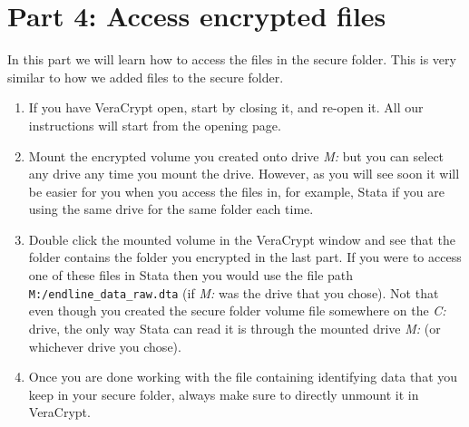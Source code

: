 \documentclass{tufte-handout}
\begin{document}
\section{Part 4: Access encrypted files}

In this part we will learn how to access the files in the secure folder. This is very similar to how we added files to the secure folder.

\begin{enumerate}
	\item If you have VeraCrypt open, start by closing it, and re-open it. All our instructions will start from the opening page.
	\item Mount the encrypted volume you created onto drive \textit{M:} but you can select any drive any time you mount the drive. However, as you will see soon it will be easier for you when you access the files in, for example, Stata if you are using the same drive for the same folder each time.
	\item Double click the mounted volume in the VeraCrypt window and see that the folder contains the folder you encrypted in the last part. If you were to access one of these files in Stata then you would use the file path \texttt{M:/endline\_data\_raw.dta} (if \textit{M:} was the drive that you chose). Not that even though you created the secure folder volume file somewhere on the \textit{C:} drive, the only way Stata can read it is through the mounted drive \textit{M:} (or whichever drive you chose).
	\item Once you are done working with the file containing identifying data that you keep in your secure folder, always make sure to directly unmount it in VeraCrypt.   
\end{enumerate}

\newpage
\end{document}
